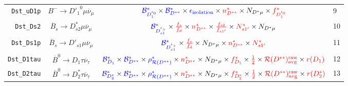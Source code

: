 \begin{landscape}
\begin{table}
\begin{tabular}{r|c|c|l}
    \texttt{Dst\_uD1p} &                 $B^- \rightarrow {D'_1}^0 \mu \overline{\nu}_\mu$                 &                                                                              $\textcolor{blue}{\mathcal{B}^{*}_{D_1^{'0}}} \times \textcolor{blue}{\mathcal{B}^*_{D^{**}}} \times \textcolor{blue}{\epsilon_\text{isolation}} \times \textcolor{red}{n^{*}_{D^{**}}} \times N_{D^* \mu} \times \textcolor{red}{f^{*}_{D_1^{'0}}}$                                                                               &                9 \\
     \texttt{Dst\_Ds2} &           $\overline{B}_s \rightarrow D_{s2}^* \mu \overline{\nu}_\mu$            &                                                                                      $\textcolor{blue}{\mathcal{B}^{*}_{D_{s1}^{'+}}} \times \textcolor{red}{\frac{f_s}{f_d}} \times \textcolor{red}{n^{*}_{D^{**}}} \times \textcolor{red}{\frac{f_{s2}}{f_{s1'}}} \times \textcolor{red}{N^*_{s1'}} \times N_{D^* \mu}$                                                                                       &               10 \\
    \texttt{Dst\_Ds1p} &            $\overline{B}_s \rightarrow D'_{s1} \mu \overline{\nu}_\mu$            &                                                                                                              $\textcolor{blue}{\mathcal{B}^{*}_{D_{s1}^{'+}}} \times \textcolor{red}{\frac{f_s}{f_d}} \times N_{D^* \mu} \times \textcolor{red}{n^{*}_{D^{**}}} \times \textcolor{red}{N^*_{s1'}}$                                                                                                              &               11 \\
   \texttt{Dst\_D1tau} &             $\overline{B}^0 \rightarrow D_1 \tau \overline{\nu}_\tau$             &              $\textcolor{blue}{\mathcal{B}^{*}_{D_1}} \times \textcolor{blue}{\mathcal{B}^*_{D^{**}}} \times \textcolor{blue}{\rho_{\mathcal{R}(D^{**})}^*} \times \textcolor{red}{n^{*}_{D^{**}}} \times N_{D^* \mu} \times \textcolor{red}{f^{*}_{D_1}} \times \textcolor{red}{\frac{1}{2}} \times \textcolor{red}{\mathcal{R}(D^{**})_\text{avg}^\text{raw}} \times \textcolor{red}{r({D_1})}$               &               12 \\
   \texttt{Dst\_D2tau} &            $\overline{B}^0 \rightarrow D^*_2 \tau \overline{\nu}_\tau$            &           $\textcolor{blue}{\mathcal{B}^{*}_{D_2^*}} \times \textcolor{blue}{\mathcal{B}^*_{D^{**}}} \times \textcolor{blue}{\rho_{\mathcal{R}(D^{**})}^*} \times \textcolor{red}{n^{*}_{D^{**}}} \times N_{D^* \mu} \times \textcolor{red}{f^{*}_{D_2^*}} \times \textcolor{red}{\frac{1}{2}} \times \textcolor{red}{\mathcal{R}(D^{**})_\text{avg}^\text{raw}} \times \textcolor{red}{r({D_2^*})}$            &               13 \\

\end{tabular}
\end{table}
\end{landscape}
